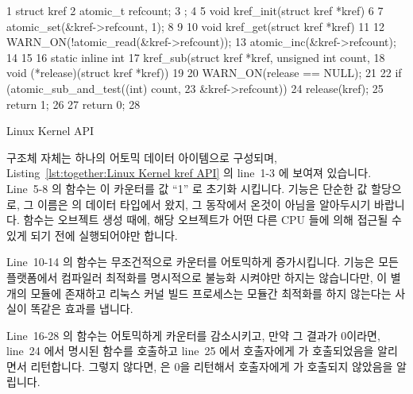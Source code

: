 \begin{listing}[tbp]
{ \scriptsize
\begin{verbbox}
  1 struct kref {
  2   atomic_t refcount;
  3 };
  4 
  5 void kref_init(struct kref *kref)
  6 {
  7   atomic_set(&kref->refcount, 1);
  8 }
  9 
 10 void kref_get(struct kref *kref)
 11 {
 12   WARN_ON(!atomic_read(&kref->refcount));
 13   atomic_inc(&kref->refcount);
 14 }
 15 
 16 static inline int
 17 kref_sub(struct kref *kref, unsigned int count,
 18          void (*release)(struct kref *kref))
 19 {
 20   WARN_ON(release == NULL);
 21 
 22   if (atomic_sub_and_test((int) count,
 23                           &kref->refcount)) {
 24     release(kref);
 25     return 1;
 26   }
 27   return 0;
 28 }
\end{verbbox}
}
\centering
\theverbbox
\caption{Linux Kernel  API}
\label{lst:together:Linux Kernel kref API}
\end{listing}

 구조체 자체는 하나의 어토믹 데이터 아이템으로 구성되며,
Listing~\ref{lst:together:Linux Kernel kref API} 의 line~1-3 에 보여져 있습니다.
Line~5-8 의  함수는 이 카운터를 값 ``1'' 로 초기화 시킵니다.
 기능은 단순한 값 할당으로, 그 이름은  의 데이터
타입에서 왔지, 그 동작에서 온것이 아님을 알아두시기 바랍니다.
 함수는 오브젝트 생성 때에, 해당 오브젝트가 어떤 다른 CPU 들에
의해 접근될 수 있게 되기 전에 실행되어야만 합니다.
\iffalse

The \co{kref} structure itself, consisting of a single atomic
data item, is shown in lines~1-3 of
Listing~\ref{lst:together:Linux Kernel kref API}.
The \co{kref_init()} function on lines~5-8 initializes the counter
to the value ``1''.
Note that the \co{atomic_set()} primitive is a simple
assignment, the name stems from the data type of \co{atomic_t}
rather than from the operation.
The \co{kref_init()} function must be invoked during object creation,
before the object has been made available to any other CPU.
\fi

Line~10-14 의  함수는 무조건적으로 카운터를 어토믹하게
증가시킵니다.
 기능은 모든 플랫폼에서 컴파일러 최적화를 명시적으로 불능화
시켜야만 하지는 않습니다만,  이 별개의 모듈에 존재하고 리눅스 커널
빌드 프로세스는 모듈간 최적화를 하지 않는다는 사실이 똑같은 효과를 냅니다.

Line~16-28 의  함수는 어토믹하게 카운터를 감소시키고, 만약 그
결과가 0이라면, line~24 에서 명시된  함수를 호출하고 line~25 에서
호출자에게  가 호출되었음을 알리면서 리턴합니다.
그렇지 않다면,  은 0을 리턴해서 호출자에게  가
호출되지 않았음을 알립니다.
\iffalse


